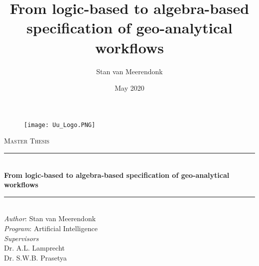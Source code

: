 \documentclass{article}
\title{From logic-based to algebra-based specification of geo-analytical workflows}
\author{Stan van Meerendonk }
\date{May 2020}
\begin{document}

\begin{titlepage} %
	\newcommand{\HRule}{\rule{\linewidth}{0.5mm}} %
	
	\center %
	
	
	
	\begin{figure}
	    \centering
	    \texttt{[image: Uu\_Logo.PNG]}
	\end{figure}
	\smallskip
	
	\textsc{\Large Master Thesis}\\[0.5cm] %
	
	
	
	\HRule\\[0.4cm]
	
	{\huge\bfseries From logic-based to algebra-based specification of geo-analytical workflows}\\[0.4cm] %
	
	\HRule\\[1.5cm]
	
	
	\large
	\textit{Author}: Stan van Meerendonk\\
	\textit{Program}: Artificial Intelligence\\
    \vspace{5 mm}
	\textit{Supervisors}\\
	Dr. A.L. Lamprecht\\
	Dr. S.W.B. Prasetya
	

\end{titlepage}
\end{document}
